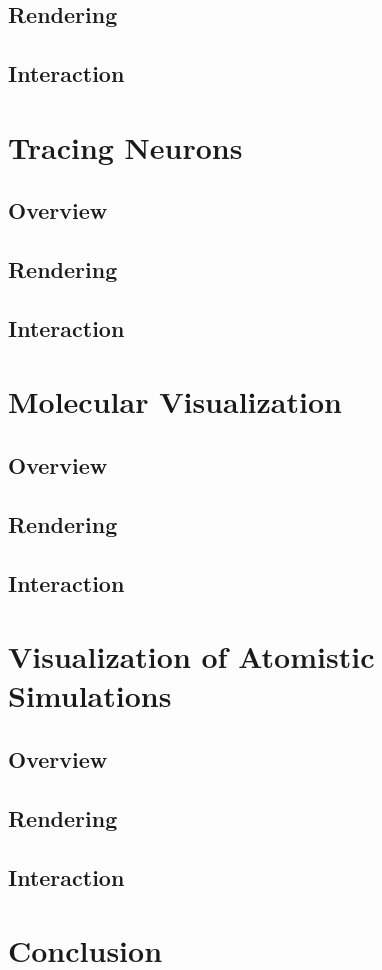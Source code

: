 \documentclass[10pt,twocolumn,letterpaper]{article}
\begin{document}
\subsection{Rendering}
\subsection{Interaction}

\section{Tracing Neurons}
\subsection{Overview}
\subsection{Rendering}
\subsection{Interaction}

\section{Molecular Visualization}
\subsection{Overview}
\subsection{Rendering}
\subsection{Interaction}

\section{Visualization of Atomistic Simulations}
\subsection{Overview}
\subsection{Rendering}
\subsection{Interaction}

\section{Conclusion}

{\small


}
\end{document}
